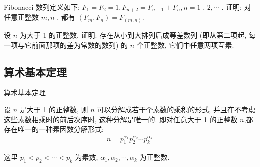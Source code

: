 \documentclass[aspectratio=169]{ctexbeamer}
\theoremstyle{definition}
\begin{document}
\begin{frame}[t]
	\begin{example}
		Fibonacci 数列定义如下:  $F_{1}=F_{2}=1, F_{n+2}=F_{n+1}+F_{n}, n=1$ ,  $2, \cdots$ . 证明: 对任意正整数 $m ,  n$ , 都有 $\left(F_{m}, F_{n}\right)=F_{(m, n)}$.
	\end{example}
\end{frame}

\begin{frame}[t]
	\begin{example}
		设 $n$ 为大于 1 的正整数. 证明: 存在从小到大排列后成等差数列 (即从第二项起, 每一项与它前面那项的差为常数的数列) 的 $n$ 个正整数, 它们中任意两项互素.
	\end{example}
\end{frame}

\subsection{算术基本定理}
\setcounter{theorem}{0}
\begin{frame}{算术基本定理}
	\begin{theorem}[算术基本定理]
		设 $n$ 是大于 1 的正整数, 则 $n$ 可以分解成若干个素数的乘积的形式, 并且在不考虑这些素数相乘时的前后次序时, 这种分解是唯一的. 即对任意大于 1 的正整数 $n$,都存在唯一的一种素因数分解形式:
		\begin{align*}
			n=p_{1}^{\alpha_{1}} p_{2}^{\alpha_{2}} \cdots p_{k}^{\alpha_{k}}
		\end{align*}

		这里 $p_{1}<p_{2}<\cdots<p_{k}$ 为素数,  $\alpha_{1}, \alpha_{2}, \cdots, \alpha_{k}$ 为正整数.
	\end{theorem}
\end{frame}
\end{document}
